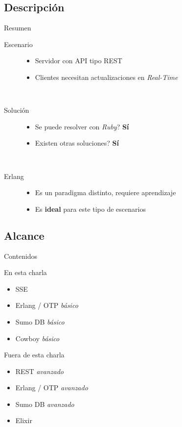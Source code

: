 \documentclass[utf8,hyperref={colorlinks=true}]{beamer}
\begin{document}
\subsection{Descripci\'on}
\begin{frame}{Resumen}

\begin{description}
	\item[Escenario]
		\begin{itemize}
			\item Servidor con API tipo REST
			\item Clientes necesitan actualizaciones en \emph{Real-Time}
		\end{itemize}
	\ \\
	\pause
	\item[Soluci\'on]
		\begin{itemize}
			\item Se puede resolver con \emph{Ruby}? \textbf{S\'i}
			\item Existen otras soluciones? \textbf{S\'i}
		\end{itemize}
	\ \\
	\pause
	\item[Erlang]
		\begin{itemize}
			\item Es un paradigma distinto, requiere aprendizaje
			\item Es \textbf{ideal} para este tipo de escenarios
		\end{itemize}
\end{description}

\end{frame}

\subsection{Alcance}
\begin{frame}{Contenidos}
\begin{multicols}{2}
	\alert{En esta charla}
		\begin{itemize} \itemsep1em
			\item<+-> SSE
			\item<+-> Erlang / OTP \emph{b\'asico}
			\item<+-> Sumo DB \emph{b\'asico}
			\item<+-> Cowboy \emph{b\'asico}
		\end{itemize}
\columnbreak
	\alert{Fuera de esta charla}
		\begin{itemize} \itemsep1em
			\item<+-> REST \emph{avanzado}
			\item<+-> Erlang / OTP \emph{avanzado}
			\item<+-> Sumo DB \emph{avanzado}
			\item<+-> Elixir
		\end{itemize}
\end{multicols}
\end{frame}
\end{document}
